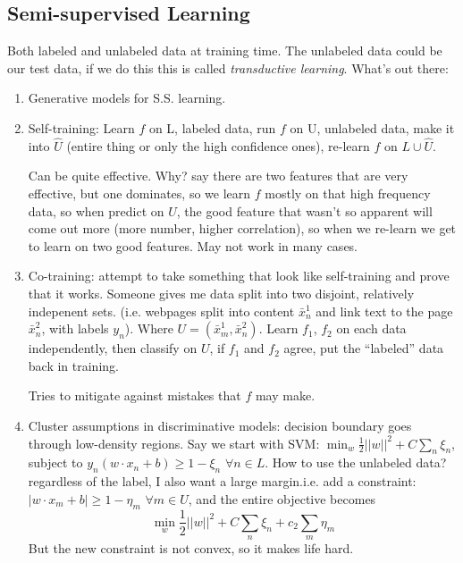 \subsection{Semi-supervised Learning}

Both labeled and unlabeled data at training time. The unlabeled data
could be our test data, if we do this this is called
\emph{transductive learning}.
What's out there:
\begin{enumerate}
\item Generative models for S.S. learning.
\item Self-training: Learn $f$ on L, labeled data, run $f$ on U,
  unlabeled data, make it into $\hat U$ (entire thing or only the high
  confidence ones), re-learn $f$ on $L\cup \hat
  U$.

Can be quite effective. Why? say there are two features that are very
effective, but one dominates, so we learn $f$ mostly on that high
frequency data, so when predict on $U$, the good feature that wasn't
so apparent will come out more (more number, higher correlation), so
when we re-learn we get to learn on two good features. May not work in
many cases.
\item Co-training: attempt to take something that look like
  self-training and prove that it works. Someone gives me data split
  into two disjoint, relatively indepenent sets. (i.e. webpages split
  into content $\bar x_n^1$ and link text to
  the page $\bar x_n^2$, with labels $y_n$).  Where $U = (\bar x_m^1,
  \bar x_n^2)$. Learn $f_1$, $f_2$ on each data independently, then
  classify on $U$, if $f_1$ and $f_2$ agree, put the ``labeled'' data
  back in training.

Tries to mitigate against mistakes that $f$ may make.
\begin{algorithmic}
\end{algorithmic}
\item Cluster assumptions in discriminative models: decision boundary
  goes through low-density regions.
Say we start with SVM: $\min_w \frac{1}{2}||w||^2 + C\sum_n \xi_n$,
subject to $y_n(w\cdot x_n + b) \ge 1 - \xi_n$ $\forall n\in L$.
How to use the unlabeled data? regardless of the label, I also want a
large margin.i.e. add a constraint: $|w\cdot x_m + b| \ge 1 - \eta_m$ $\forall m
\in U$, and the entire objective becomes $$\min_w \frac{1}{2}||w||^2 +
C\sum_n \xi_n + c_2\sum_m\eta_m$$ But the new constraint is not
convex, so it makes life hard. 


\end{enumerate}
